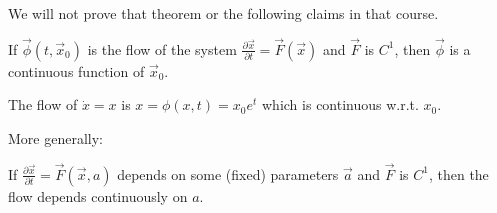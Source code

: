 We will not prove that theorem or the following claims in that course. 

\begin{lemma}
    If $\vec{\phi}(t,\vec{x}_0)$ is the flow of the system $\frac{\partial \vec{x}}{\partial t} = \vec{F}(\vec{x})$ and $\vec{F}$ is $C^1$, then $\vec{\phi}$ is a continuous function of $\vec{x}_0$.
\end{lemma}

\begin{example}
    The flow of $\dot{x} = x$ is $x=\phi(x,t)=x_0 e^t$ which is continuous w.r.t. $x_0$.
\end{example}

\noindent More generally:

\begin{lemma}
    If $\frac{\partial \vec{x}}{\partial t} = \vec{F}(\vec{x},a)$ depends on some (fixed) parameters $\vec{a}$ and $\vec{F}$ is $C^1$, then the flow depends continuously on $a$.
\end{lemma}